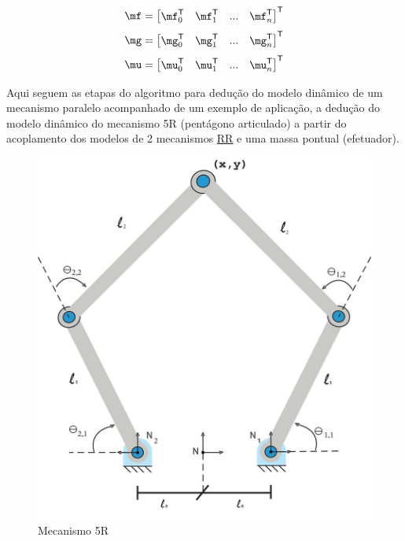 \documentclass[a4paper,11pt,brazil,fleqn]{article}
\begin{document}
\begin{equation} \label{eq:Matrizf2}
\mf = \begin{bmatrix}
\mf_0^\msT & \mf_1^\msT & ... & \mf_{n}^\msT
\end{bmatrix}^\msT
\end{equation}
\begin{equation} \label{eq:Matrizg2}
\mg = \begin{bmatrix}
\mg_0^\msT & \mg_1^\msT & ... & \mg_{n}^\msT
\end{bmatrix}^\msT
\end{equation}
\begin{equation}
\mu =
\begin{bmatrix} \label{eq:Matrizu}
\mu_0^\msT & \mu_1^\msT & ... & \mu_{n}^\msT
\end{bmatrix}^\msT
\end{equation}

Aqui seguem as etapas do algoritmo para dedu\c{c}\~ao do modelo din\^amico de um mecanismo paralelo acompanhado de um exemplo de aplica\c{c}\~ao, a dedu\c{c}\~ao do modelo din\^amico do mecanismo 5R (pent\'agono articulado) a partir do acoplamento dos modelos de 2 mecanismos \underline{R}\underline{R} e uma massa pontual (efetuador).

\begin{figure}[H]
	\centering
	\includegraphics[scale=0.4]{5Rscan.jpg}
	\caption{Mecanismo 5R}
	\label{fig:RR}
\end{figure}
\end{document}
